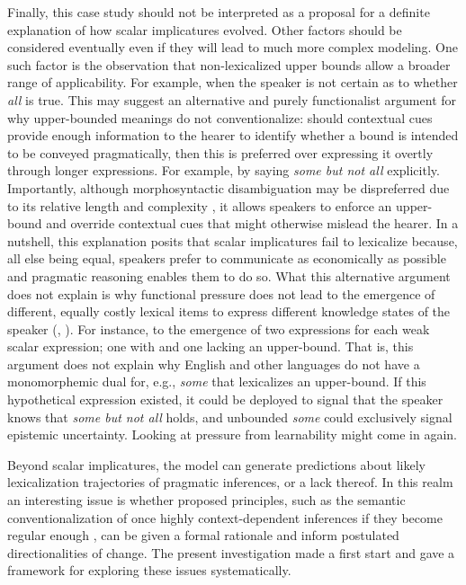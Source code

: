 \documentclass[a4paper, 11pt]{article}
\theoremstyle{Satz}
\begin{document}
Finally, this case study should not be interpreted as a proposal for a definite explanation of
how scalar implicatures evolved. Other factors should be considered eventually even if they
will lead to much more complex modeling. One such factor is the observation that
non-lexicalized upper bounds allow a broader range of applicability. For example, when the speaker is
not certain as to whether \emph{all} is true. This may suggest an alternative and purely
functionalist argument for why upper-bounded meanings do not conventionalize: should contextual
cues provide enough information to the hearer to identify whether a bound is intended to be
conveyed pragmatically, then this is preferred over expressing it overtly through longer
expressions. For example, by saying {\em some but not all} explicitly. Importantly, although
morphosyntactic disambiguation may be dispreferred due to its relative length and complexity
\citep{piantadosi+etal:2012b}, it allows speakers to enforce an upper-bound and override
contextual cues that might otherwise mislead the hearer. In a nutshell, this explanation posits that scalar implicatures fail to lexicalize because, all else being equal, speakers prefer to communicate as economically as possible and pragmatic reasoning enables them to do so. What this alternative argument does not explain is why functional pressure does not lead to the emergence of different, equally costly lexical items to express different knowledge states of the speaker (\citealt[252-267]{horn:1984}, 
\citealt{horn:1972,traugott:2004,vdAuwera:2010}). For instance, to the emergence of two expressions for each weak scalar expression; one with and one lacking an upper-bound. That is, this argument does not explain why English and other languages do not have a monomorphemic dual for, e.g., {\em some} that lexicalizes an upper-bound. If this hypothetical expression existed, it could be deployed to signal that the speaker knows that {\em some but not all} holds, and unbounded {\em some} could exclusively signal epistemic uncertainty. Looking at pressure from learnability might come in again. 

Beyond scalar implicatures, the model can generate predictions about likely lexicalization trajectories of pragmatic inferences, or a lack thereof. In this realm an interesting issue is whether proposed principles, such as the semantic conventionalization of once highly context-dependent inferences if they become regular enough \citep{levinson:2000,traugott:2004}, can be given
a formal rationale and inform postulated directionalities of change. The present investigation made a first start and gave a framework for exploring these issues systematically.
\end{document}
